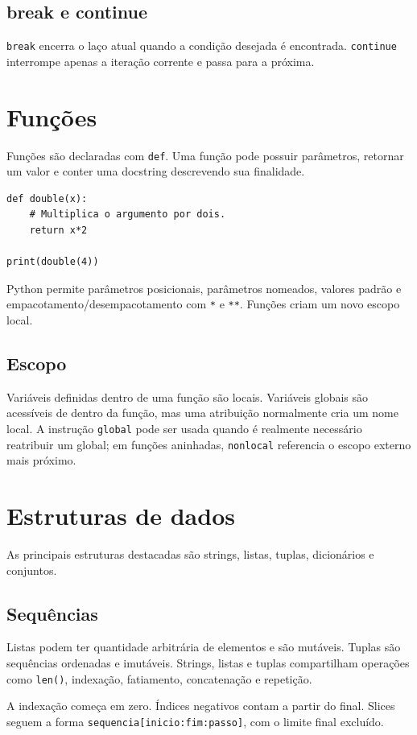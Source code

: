 \documentclass[11pt,a4paper]{article}
\begin{document}
\subsection{break e continue}
\texttt{break} encerra o laço atual quando a condição desejada é encontrada. \texttt{continue} interrompe apenas a iteração corrente e passa para a próxima.

\section{Funções}
Funções são declaradas com \texttt{def}. Uma função pode possuir parâmetros, retornar um valor e conter uma docstring descrevendo sua finalidade.

\begin{lstlisting}
def double(x):
    # Multiplica o argumento por dois.
    return x*2

print(double(4))
\end{lstlisting}

Python permite parâmetros posicionais, parâmetros nomeados, valores padrão e empacotamento/desempacotamento com \texttt{*} e \texttt{**}. Funções criam um novo escopo local.

\subsection{Escopo}
Variáveis definidas dentro de uma função são locais. Variáveis globais são acessíveis de dentro da função, mas uma atribuição normalmente cria um nome local. A instrução \texttt{global} pode ser usada quando é realmente necessário reatribuir um global; em funções aninhadas, \texttt{nonlocal} referencia o escopo externo mais próximo.

\section{Estruturas de dados}
As principais estruturas destacadas são strings, listas, tuplas, dicionários e conjuntos.

\subsection{Sequências}
Listas podem ter quantidade arbitrária de elementos e são mutáveis. Tuplas são sequências ordenadas e imutáveis. Strings, listas e tuplas compartilham operações como \texttt{len()}, indexação, fatiamento, concatenação e repetição.

A indexação começa em zero. Índices negativos contam a partir do final. Slices seguem a forma \texttt{sequencia[inicio:fim:passo]}, com o limite final excluído.
\end{document}
